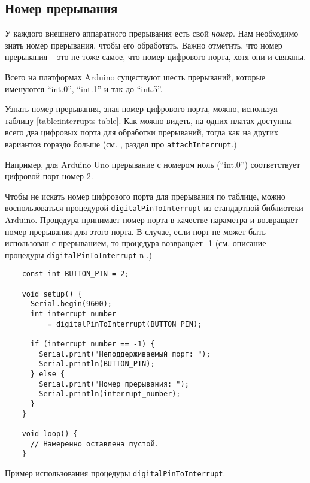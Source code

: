 \documentclass[../sparc.tex]{subfiles}
\begin{document}
\subsection{Номер прерывания}
\label{subsection:interrupts-number}

У каждого внешнего аппаратного прерывания есть свой \emph{номер}.  Нам
необходимо знать номер прерывания, чтобы его обработать.  Важно отметить, что
номер прерывания -- это не тоже самое, что номер цифрового порта, хотя они и
связаны.

Всего на платформах Arduino существуют шесть прерываний, которые именуются
``int.0'', ``int.1'' и так до ``int.5''.


Узнать номер прерывания, зная номер цифрового порта, можно, используя таблицу
\ref{table:interrupts-table}.  Как можно видеть, на одних платах доступны всего
два цифровых порта для обработки прерываний, тогда как на других вариантов
гораздо больше (см. \cite{arduino:reference}, раздел про
\texttt{attachInterrupt}.)

Например, для Arduino Uno прерывание с номером ноль (``int.0'') соответствует
цифровой порт номер 2.

Чтобы не искать номер цифрового порта для прерывания по таблице, можно
воспользоваться процедурой \texttt{digitalPinToInterrupt} из стандартной
библиотеки Arduino.  Процедура принимает номер порта в качестве параметра и
возвращает номер прерывания для этого порта.  В случае, если порт не может быть
использован с прерыванием, то процедура возвращает -1 (см. описание процедуры
\texttt{digitalPinToInterrupt} в \cite{arduino:reference}.)

\begin{listing}[H]
  \begin{verbatim}
    const int BUTTON_PIN = 2;

    void setup() {
      Serial.begin(9600);
      int interrupt_number
          = digitalPinToInterrupt(BUTTON_PIN);

      if (interrupt_number == -1) {
        Serial.print("Неподдерживаемый порт: ");
        Serial.println(BUTTON_PIN);
      } else {
        Serial.print("Номер прерывания: ");
        Serial.println(interrupt_number);
      }
    }

    void loop() {
      // Намеренно оставлена пустой.
    }
  \end{verbatim}
  \caption{Пример использования процедуры \texttt{digitalPinToInterrupt}.}
  \label{listing:interrupts-digital-pin-to-interrupt}
\end{listing}
\end{document}
